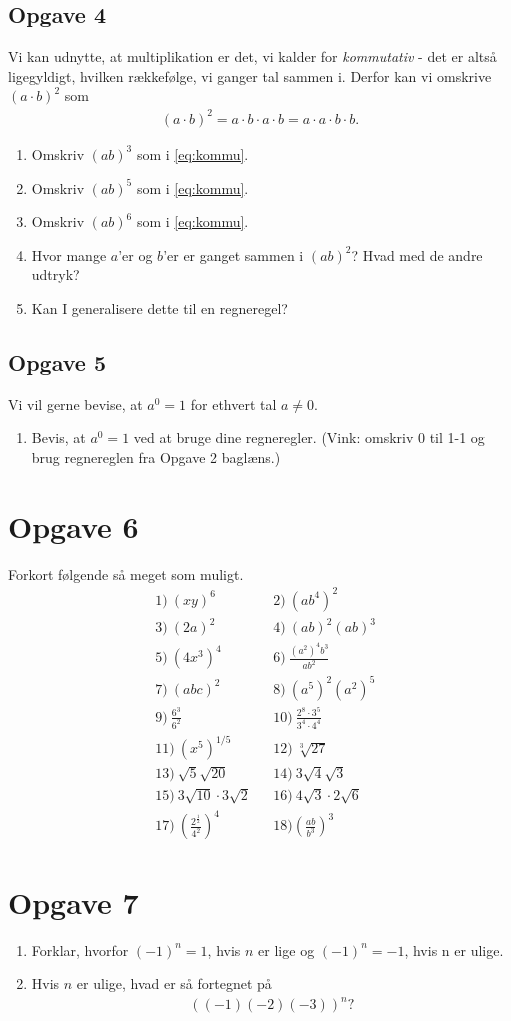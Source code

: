 \subsection*{Opgave 4}
Vi kan udnytte, at multiplikation er det, vi kalder for \textit{kommutativ} - det er altså ligegyldigt, hvilken rækkefølge, vi ganger tal sammen i. Derfor kan vi omskrive $(a\cdot b)^2$ som
\begin{align}\label{eq:kommu}
	(a\cdot b)^2 = a\cdot b \cdot a \cdot b = a\cdot a\cdot b \cdot b.
\end{align}
\begin{enumerate}[label=\roman*)]
	\item Omskriv $(ab)^3$ som i \eqref{eq:kommu}.
	\item Omskriv $(ab)^5$ som i \eqref{eq:kommu}.
	\item Omskriv $(ab)^6$ som i \eqref{eq:kommu}.
	\item Hvor mange $a$'er og $b$'er er ganget sammen i $(ab)^2$? Hvad med de andre udtryk?
	\item Kan I generalisere dette til en regneregel?
\end{enumerate}

\subsection*{Opgave 5}
Vi vil gerne bevise, at $a^0 = 1$ for ethvert tal $a \neq 0$. 
\begin{enumerate}[label=\roman*)]
	\item Bevis, at $a^0 = 1$ ved at bruge dine regneregler. (Vink: omskriv $0$ til 1-1 og brug regnereglen fra
	Opgave 2 baglæns.)
\end{enumerate}


\section*{Opgave 6}
Forkort følgende så meget som muligt. 
\begin{align*}
&1)\ (xy)^6   &&2)\ (ab^4)^2     \\
&3)\ (2a)^2   &&4)\  (ab)^2(ab)^3    \\
&5)\  (4x^3)^4             &&6)\ \frac{(a^2)^4b^3}{ab^2}\\
 &7)\ (abc)^2      &&8)\ (a^5)^2(a^2)^5\\
 &9)\ \frac{6^3}{6^2} &&10)\ \frac{2^8\cdot 3^5}{3^4\cdot 4^4}\\
 &11)\  (x^5)^{1/5}            &&12)\ \sqrt[3]{27}\\
 &13)\ \sqrt{5}\sqrt{20}      &&14)\ 3\sqrt{4}\sqrt{3}\\
 &15)\ 3\sqrt{10}\cdot3\sqrt{2} &&16)\ 4\sqrt{3}\cdot2\sqrt{6} \\
&17)\ \left(\frac{2^\frac{1}{2}}{4^2}\right)^4  &&18) \left(\frac{ab}{b^3}\right)^3
\end{align*}

\section*{Opgave 7}
\begin{enumerate}[label=\roman*)]
	\item Forklar, hvorfor $(-1)^n = 1$, hvis $n$ er lige og  $(-1)^n=-1$, hvis n er ulige. 
	\item Hvis $n$ er ulige, hvad er så fortegnet på
	\begin{align*}
		((-1)(-2)(-3))^n?
	\end{align*}
\end{enumerate}
